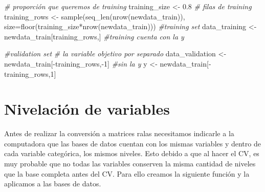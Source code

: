 \documentclass[
]{book}
\newenvironment{Shaded}{\begin{snugshade}}{\end{snugshade}}
\newcommand{\AttributeTok}[1]{\textcolor[rgb]{0.77,0.63,0.00}{#1}}
\newcommand{\CommentTok}[1]{\textcolor[rgb]{0.56,0.35,0.01}{\textit{#1}}}
\newcommand{\DecValTok}[1]{\textcolor[rgb]{0.00,0.00,0.81}{#1}}
\newcommand{\FloatTok}[1]{\textcolor[rgb]{0.00,0.00,0.81}{#1}}
\newcommand{\FunctionTok}[1]{\textcolor[rgb]{0.00,0.00,0.00}{#1}}
\newcommand{\NormalTok}[1]{#1}
\newcommand{\OtherTok}[1]{\textcolor[rgb]{0.56,0.35,0.01}{#1}}
\newcommand{\SpecialCharTok}[1]{\textcolor[rgb]{0.00,0.00,0.00}{#1}}
\begin{document}
\begin{Shaded}
\begin{Highlighting}[]
\CommentTok{\# proporción que queremos de training}
\NormalTok{training\_size }\OtherTok{\textless{}{-}} \FloatTok{0.8}
\CommentTok{\# filas de training}
\NormalTok{training\_rows }\OtherTok{\textless{}{-}} \FunctionTok{sample}\NormalTok{(}\FunctionTok{seq\_len}\NormalTok{(}\FunctionTok{nrow}\NormalTok{(newdata\_train)),}
                        \AttributeTok{size=}\FunctionTok{floor}\NormalTok{(training\_size}\SpecialCharTok{*}\FunctionTok{nrow}\NormalTok{(newdata\_train)))}
\CommentTok{\#training set}
\NormalTok{data\_training }\OtherTok{\textless{}{-}}\NormalTok{ newdata\_train[training\_rows,]}
\CommentTok{\#training cuenta con la y}


\CommentTok{\#validation set}
\CommentTok{\# la variable objetivo por separado}
\NormalTok{data\_validation }\OtherTok{\textless{}{-}}\NormalTok{ newdata\_train[}\SpecialCharTok{{-}}\NormalTok{training\_rows,}\SpecialCharTok{{-}}\DecValTok{1}\NormalTok{] }\CommentTok{\#sin la y}
\NormalTok{y }\OtherTok{\textless{}{-}}\NormalTok{ newdata\_train[}\SpecialCharTok{{-}}\NormalTok{training\_rows,}\DecValTok{1}\NormalTok{] }
\end{Highlighting}
\end{Shaded}

\hypertarget{nivelaciuxf3n-de-variables}{%
\section{Nivelación de variables}\label{nivelaciuxf3n-de-variables}}

Antes de realizar la conversión a matrices ralas necesitamos indicarle a la computadora que las bases de datos cuentan con los mismas variables y dentro de cada variable categórica, los mismos niveles. Esto debido a que al hacer el CV, es muy probable que no todas las variables conserven la misma cantidad de niveles que la base completa antes del CV. Para ello creamos la siguiente función y la aplicamos a las bases de datos.
\end{document}
